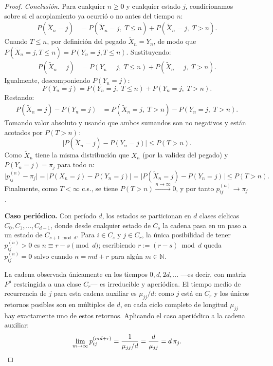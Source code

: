 \documentclass[12pt]{book}
\begin{document}
\begin{proof}
    \smallskip
    \textit{Conclusión.} Para cualquier $n \ge 0$ y cualquier estado $j$, condicionamos sobre si el acoplamiento ya ocurrió o no antes del tiempo $n$:
    \begin{align*}
        P(\tilde{X}_n = j)
        &= P(\tilde{X}_n = j,\; T \le n) + P(\tilde{X}_n = j,\; T > n).
    \end{align*}
    Cuando $T \le n$, por definición del pegado $\tilde{X}_n = Y_n$, de modo que $P(\tilde{X}_n = j, T \le n) = P(Y_n = j, T \le n)$. Sustituyendo:
    \begin{align*}
        P(\tilde{X}_n = j)
        &= P(Y_n = j,\; T \le n) + P(\tilde{X}_n = j,\; T > n).
    \end{align*}
    Igualmente, descomponiendo $P(Y_n = j)$:
    \[
        P(Y_n = j) = P(Y_n = j,\; T \le n) + P(Y_n = j,\; T > n).
    \]
    Restando:
    \begin{align*}
        P(\tilde{X}_n = j) - P(Y_n = j)
        &= P(\tilde{X}_n = j,\; T > n) - P(Y_n = j,\; T > n).
    \end{align*}
    Tomando valor absoluto y usando que ambos sumandos son no negativos y están acotados por $P(T > n)$:
    \[
        \bigl|P(\tilde{X}_n = j) - P(Y_n = j)\bigr| \le P(T > n).
    \]
    Como $\tilde{X}_n$ tiene la misma distribución que $X_n$ (por la validez del pegado) y $P(Y_n = j) = \pi_j$ para todo $n$:
    \[
        \bigl|p_{ij}^{(n)} - \pi_j\bigr| = \bigl|P(X_n = j) - P(Y_n = j)\bigr| = \bigl|P(\tilde{X}_n = j) - P(Y_n = j)\bigr| \le P(T > n).
    \]
    Finalmente, como $T < \infty$ c.s., se tiene $P(T > n) \xrightarrow{n\to\infty} 0$, y por tanto $p_{ij}^{(n)} \to \pi_j$.

    \medskip
    \textbf{Caso periódico.}
    Con período $d$, los estados se particionan en $d$ clases cíclicas $C_0, C_1, \dots, C_{d-1}$, donde desde cualquier estado de $C_s$ la cadena pasa en un paso a un estado de $C_{s+1\bmod d}$. Para $i\in C_s$ y $j\in C_r$, la única posibilidad de tener $p_{ij}^{(n)}>0$ es $n \equiv r-s \pmod{d}$; escribiendo $r := (r-s)\bmod d$ queda $p_{ij}^{(n)}=0$ salvo cuando $n=md+r$ para algún $m\in\mathbb{N}$.

    La cadena observada únicamente en los tiempos $0, d, 2d, \dots$ —es decir, con matriz $P^d$ restringida a una clase $C_r$— es irreducible y aperiódica. El tiempo medio de recurrencia de $j$ para esta cadena auxiliar es $\mu_{jj}/d$: como $j$ está en $C_r$ y los únicos retornos posibles son en múltiplos de $d$, en cada ciclo completo de longitud $\mu_{jj}$ hay exactamente uno de estos retornos. Aplicando el caso aperiódico a la cadena auxiliar:
    \[
        \lim_{m\to\infty} p_{ij}^{(md+r)} = \frac{1}{\mu_{jj}/d} = \frac{d}{\mu_{jj}} = d\,\pi_j. \qedhere
    \]
\end{proof}
\end{document}
